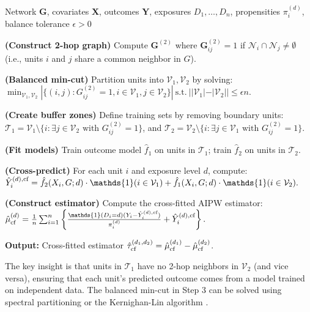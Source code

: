\documentclass[twoside,letterpaper]{article}
\newcommand{\mathbbm}[1]{\mathds{#1}}
\theoremstyle{plain}
\theoremstyle{definition}
\theoremstyle{remark}
\newcommand{\bY}{\boldsymbol{Y}}
\newcommand{\bG}{\boldsymbol{G}}
\newcommand{\bX}{\boldsymbol{X}}
\newcommand{\cN}{\mathcal{N}}
\newcommand{\indicator}{\mathbbm{1}}
\newcommand{\sumi}{\sum_{i=1}^n}
\begin{document}
\begin{algorithm}[ht!]
    \caption{Graph-Based Cross-Fitting for Network Interference}
    \label{alg:cross_fitting}
\begin{algorithmic}[1]
     Network $\bG$, covariates $\bX$, outcomes $\bY$, exposures $D_1,\ldots,D_n$, propensities $\pi_i^{(d)}$, balance tolerance $\epsilon > 0$
    
    \STATE \textbf{(Construct 2-hop graph)} Compute $\bG^{(2)}$ where $\bG^{(2)}_{ij} = 1$ if $\cN_i \cap \cN_j \neq \emptyset$ (i.e., units $i$ and $j$ share a common neighbor in $G$).
    
    \STATE \textbf{(Balanced min-cut)} Partition units into $\mathcal{V}_1, \mathcal{V}_2$ by solving:
    $
    \min_{\mathcal{V}_1, \mathcal{V}_2} |\{(i,j) : G^{(2)}_{ij} = 1, i \in \mathcal{V}_1, j \in \mathcal{V}_2\}| ~ \text{s.t.} ~ ||\mathcal{V}_1| - |\mathcal{V}_2|| \leq \epsilon n.
    $
    
    \STATE \textbf{(Create buffer zones)} Define training sets by removing boundary units:
    $\mathcal{T}_1 = \mathcal{V}_1 \setminus \{i : \exists j \in \mathcal{V}_2 \text{ with } G^{(2)}_{ij} = 1\}$, and
    $\mathcal{T}_2 = \mathcal{V}_2 \setminus \{i : \exists j \in \mathcal{V}_1 \text{ with } G^{(2)}_{ij} = 1\}$.
    
    \STATE \textbf{(Fit models)} Train outcome model $\hat{f}_1$ on units in $\mathcal{T}_1$; train $\hat{f}_2$ on units in $\mathcal{T}_2$.
    
    \STATE \textbf{(Cross-predict)} For each unit $i$ and exposure level $d$, compute:
    $
    \hat{Y}_i^{(d),\textup{cf}} = \hat{f}_2(X_i, G; d) \cdot \indicator(i \in \mathcal{V}_1) + \hat{f}_1(X_i, G; d) \cdot \indicator(i \in \mathcal{V}_2).
    $
    
    \STATE \textbf{(Construct estimator)} Compute the cross-fitted AIPW estimator:
    $
    \hat{\mu}^{(d)}_{\textup{cf}} = \frac{1}{n}\sumi \left\{ \frac{\indicator(D_i=d)(Y_i - \hat{Y}_i^{(d),\textup{cf}})}{\pi_i^{(d)}} + \hat{Y}_i^{(d),\textup{cf}} \right\}.
    $
    
    \STATE \textbf{Output:} Cross-fitted estimator $\hat{\tau}^{(d_1,d_2)}_{\textup{cf}} = \hat{\mu}^{(d_1)}_{\textup{cf}} - \hat{\mu}^{(d_2)}_{\textup{cf}}$.
\end{algorithmic}
\end{algorithm}

The key insight is that units in $\mathcal{T}_1$ have no 2-hop neighbors in $\mathcal{V}_2$ (and vice versa), ensuring that each unit's predicted outcome comes from a model trained on independent data. The balanced min-cut in Step 3 can be solved using spectral partitioning \citep{fiedler1973algebraic} or the Kernighan-Lin algorithm \citep{kernighan1970efficient}.  
\end{document}
